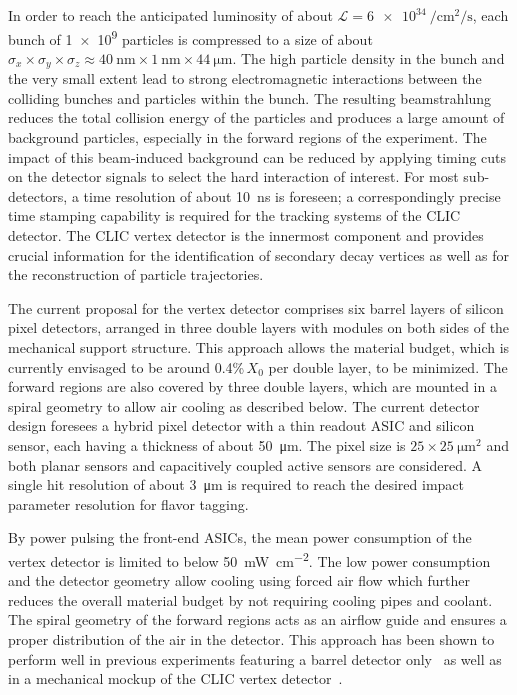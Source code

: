 \documentclass[a4paper,11pt]{article}
\begin{document}
In order to reach the anticipated luminosity of about $\mathcal{L} = \SI{6e34}{\per \square \cm \per \s}$, each bunch of \num{1e9} particles is compressed to a size of about $\sigma_x \times \sigma_y \times \sigma_z \approx \SI{40}{\nm} \times \SI{1}{\nm} \times \SI{44}{\um}$.
The high particle density in the bunch and the very small extent lead to strong electromagnetic interactions between the colliding bunches and particles within the bunch.
The resulting beamstrahlung~\cite{ep-limits} reduces the total collision energy of the particles and produces a large amount of background particles, especially in the forward regions of the experiment.
The impact of this beam-induced background can be reduced by applying timing cuts on the detector signals to select the hard interaction of interest.
For most sub-detectors, a time resolution of about \SI{10}{\ns} is foreseen; a correspondingly precise time stamping capability is required for the tracking systems of the CLIC detector.
The CLIC vertex detector is the innermost component and provides crucial information for the identification of secondary decay vertices as well as for the reconstruction of particle trajectories.

The current proposal for the vertex detector comprises six barrel layers of silicon pixel detectors, arranged in three double layers with modules on both sides of the mechanical support structure.
This approach allows the material budget, which is currently envisaged to be around 0.4\%\,$X_0$ per double layer, to be minimized.
The forward regions are also covered by three double layers, which are mounted in a spiral geometry to allow air cooling as described below.
The current detector design foresees a hybrid pixel detector with a thin readout ASIC and silicon sensor, each having a thickness of about \SI{50}{\um}.
The pixel size is $25\times\SI{25}{\um \squared}$ and both planar sensors and capacitively coupled active sensors are considered.
A single hit resolution of about \SI{3}{\um} is required to reach the desired impact parameter resolution for flavor tagging.

By power pulsing the front-end ASICs, the mean power consumption of the vertex detector is limited to below \SI{50}{\milli \watt \per \square \cm}.
The low power consumption and the detector geometry allow cooling using forced air flow which further reduces the overall material budget by not requiring cooling pipes and coolant.
The spiral geometry of the forward regions acts as an airflow guide and ensures a proper distribution of the air in the detector.
This approach has been shown to perform well in previous experiments featuring a barrel detector only~\cite{starpxl} as well as in a mechanical mockup of the CLIC vertex detector~\cite{airflow}.
\end{document}
